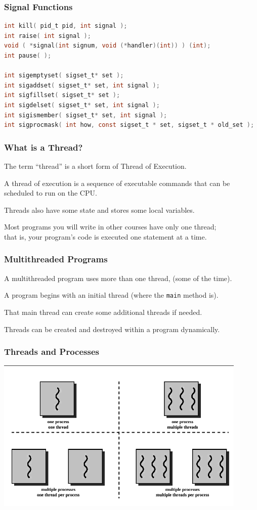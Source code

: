 \begin{frame}[fragile]
\frametitle{Signal Functions}
\begin{lstlisting}[language=C]
int kill( pid_t pid, int signal ); 
int raise( int signal );
void ( *signal(int signum, void (*handler)(int)) ) (int);
int pause( );

int sigemptyset( sigset_t* set );
int sigaddset( sigset_t* set, int signal ); 
int sigfillset( sigset_t* set );
int sigdelset( sigset_t* set, int signal ); 
int sigismember( sigset_t* set, int signal );
int sigprocmask( int how, const sigset_t * set, sigset_t * old_set ); 
\end{lstlisting}
\end{frame}


\begin{frame}
	\frametitle{What is a Thread?}

	The term ``thread'' is a short form of \alert{Thread of Execution}.

	A thread of execution is a sequence of executable commands that can be scheduled to run on the CPU.

	Threads also have some state and stores some local variables.

	Most programs you will write in other courses have only one thread;\\
	\quad that is, your program's code is executed one statement at a time.

\end{frame}

\begin{frame}
	\frametitle{Multithreaded Programs}

	A multithreaded program uses more than one thread, (some of the time).

	A program begins with an initial thread (where the \texttt{main} method is).

	That main thread can create some additional threads if needed.

	Threads can be created and destroyed within a program dynamically.

\end{frame}

\begin{frame}
	\frametitle{Threads and Processes}

	\begin{center}
		\includegraphics[width=0.9\textwidth]{images/mthread.png}
	\end{center}

\end{frame}

